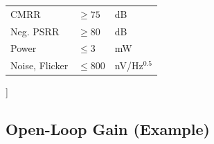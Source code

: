 \documentclass[
]{article}
\begin{document}
\begin{longtable}[]{@{}lll@{}}
\begin{minipage}[t]{0.35\columnwidth}\raggedright
CMRR\strut
\end{minipage} & \begin{minipage}[t]{0.28\columnwidth}\raggedright
\(\geq 75\)\strut
\end{minipage} & \begin{minipage}[t]{0.28\columnwidth}\raggedright
dB\strut
\end{minipage}\tabularnewline
\begin{minipage}[t]{0.35\columnwidth}\raggedright
Neg. PSRR\strut
\end{minipage} & \begin{minipage}[t]{0.28\columnwidth}\raggedright
\(\geq 80\)\strut
\end{minipage} & \begin{minipage}[t]{0.28\columnwidth}\raggedright
dB\strut
\end{minipage}\tabularnewline
\begin{minipage}[t]{0.35\columnwidth}\raggedright
Power\strut
\end{minipage} & \begin{minipage}[t]{0.28\columnwidth}\raggedright
\(\leq 3\)\strut
\end{minipage} & \begin{minipage}[t]{0.28\columnwidth}\raggedright
mW\strut
\end{minipage}\tabularnewline
\begin{minipage}[t]{0.35\columnwidth}\raggedright
Noise, Flicker\strut
\end{minipage} & \begin{minipage}[t]{0.28\columnwidth}\raggedright
\(\leq 800\)\strut
\end{minipage} & \begin{minipage}[t]{0.28\columnwidth}\raggedright
nV/Hz\(^{0.5}\)\strut
\end{minipage}\tabularnewline
\bottomrule
\end{longtable}

{]}

\hypertarget{open-loop-gain-example}{%
\subsection{Open-Loop Gain (Example)}\label{open-loop-gain-example}}
\end{document}
